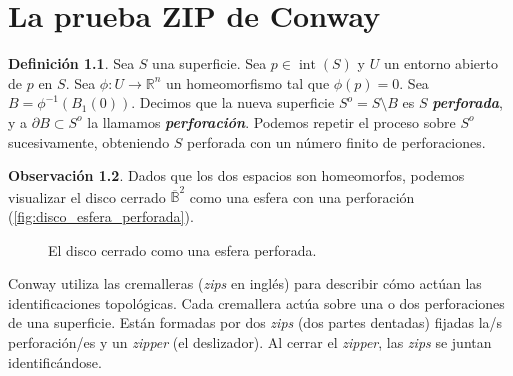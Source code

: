 \documentclass[10pt]{report}
\newcommand{\R}{\mathbb{R}}
\DeclareMathOperator{\interior}{int} %
\newcommand{\enfatiza}[1]{\textbf{\textit{#1}}}
\theoremstyle{definition}
\newtheorem{defin}{Definición}[section]
\newtheorem{obs}[defin]{Observación}
\begin{document}
\chapter{La prueba ZIP de Conway}

\begin{defin}%
\label{def:perforacion}
Sea $S$ una superficie. Sea $p\in \interior (S)$ y $U$ un entorno abierto de $p$ en $S$. Sea $\phi :U\to \R^n$ un homeomorfismo tal que $\phi (p)=0$. Sea $B=\phi ^{-1}(B_1(0))$. Decimos que la nueva superficie $S^o=S\setminus B$ es $S$ \enfatiza{perforada}, y a $\partial B\subset S^o$ la llamamos \enfatiza{perforación}. Podemos repetir el proceso sobre $S^o$ sucesivamente, obteniendo $S$ perforada con un número finito de perforaciones.
\end{defin}

\begin{obs}%
Dados que los dos espacios son homeomorfos, podemos visualizar el disco cerrado $\overline{\mathbb{B}}^2$ como una esfera con una perforación (\autoref{fig:disco_esfera_perforada}).
\end{obs}
 

\begin{figure}%
\centering
{}
\caption{El disco cerrado como una esfera perforada.\label{fig:disco_esfera_perforada}}
\end{figure}

Conway utiliza las cremalleras (\textit{zips} en inglés) para describir cómo actúan las identificaciones topológicas. Cada cremallera actúa sobre una o dos perforaciones de una superficie. Están formadas por dos \textit{zips} (dos partes dentadas) fijadas la/s perforación/es y un \textit{zipper} (el deslizador). Al cerrar el \textit{zipper}, las \textit{zips} se juntan identificándose.
\end{document}
